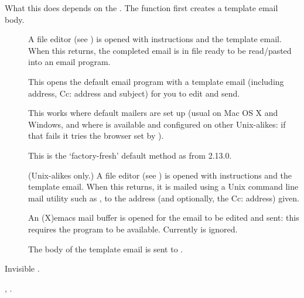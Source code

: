 \begin{Details}\relax
What this does depends on the .  The function first
creates a template email body.

\begin{description}

\item[] A file editor (see ) is
opened with instructions and the template email.  When this returns,
the completed email is in file  ready to be read/pasted
into an email program.

\item[] 
This opens the default email program with a template email
(including address, Cc: address and subject) for you to edit and
send.

This works where default mailers are set up (usual on Mac OS X and
Windows, and where  is available and configured on
other Unix-alikes: if that fails it tries the browser set by
).

This is the `factory-fresh' default method as from \R{} 2.13.0.


\item[] (Unix-alikes only.)
A file editor (see ) is
opened with instructions and the template email.  When this
returns, it is mailed using a Unix command line mail utility such
as , to the address (and optionally, the Cc: address)
given.

\item[] 
An (X)emacs mail buffer is opened for the email to be edited and
sent: this requires the  program to be
available.  Currently  is ignored.

\item[] 
The body of the template email is sent to .

\end{description}

\end{Details}
%
\begin{Value}
Invisible .
\end{Value}
%
\begin{SeeAlso}\relax
{}, .
\end{SeeAlso}
